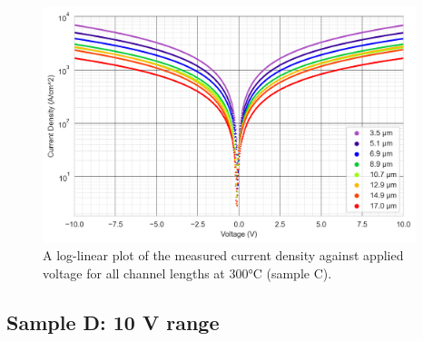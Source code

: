\begin{figure}[h]
    \centering
    \includegraphics[width=0.97\textwidth]{Chapter3/Figs/Raster/Sample C 2019/10V_Current_Density_vs_Voltage_Temperature_300_log.png}
    \caption{A log-linear plot of the measured current density against applied voltage for all channel lengths at 300\si{\degreeCelsius} (sample C).}
    \label{appfig:current_density_300}
\end{figure}

\subsection{Sample D: 10 \si{\volt} range}
\label{app:J_V_sample_D_10V}

